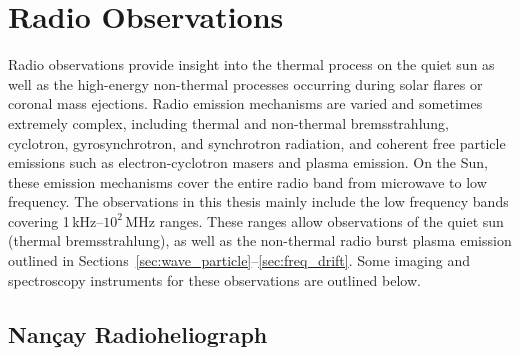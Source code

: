 \section{Radio Observations}\label{sec:3}

Radio observations provide insight into the thermal process on the quiet sun as well as the high-energy non-thermal processes occurring during solar flares or coronal mass ejections. Radio emission mechanisms are varied and sometimes extremely complex, including thermal and non-thermal bremsstrahlung, cyclotron, gyrosynchrotron, and synchrotron radiation, and coherent free particle emissions such as electron-cyclotron masers and plasma emission. On the Sun, these emission mechanisms cover the entire radio band from microwave to low frequency. The observations in this thesis mainly include the low frequency bands covering 1\,kHz--$10^2$\,MHz ranges. These ranges allow observations of the quiet sun (thermal bremsstrahlung), as well as the non-thermal radio burst plasma emission outlined in Sections~\ref{sec:wave_particle}--\ref{sec:freq_drift}. Some imaging and spectroscopy instruments for these observations are outlined below.


\subsection{Nan\c{c}ay Radioheliograph}\label{sec:33}

